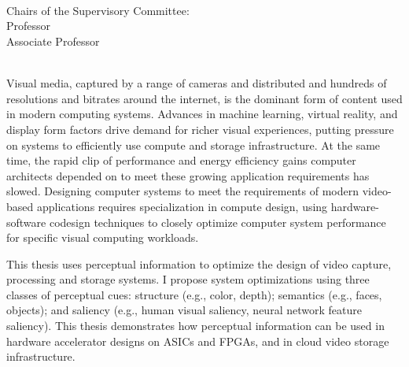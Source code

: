 \begingroup
\let\clearpage\relax
\let\cleardoublepage\relax
\let\cleardoublepage\relax

\thispagestyle{empty}
\begin{center}
     \\
    \bigskip
    {\color{CTtitle}\spacedallcaps{\myTitle} \\ \bigskip
    }
    \bigskip
    \myName \\
    \bigskip
    Chairs of the Supervisory Committee: \\
    Professor \myChair \\
    Associate Professor \myOtherChair \\
    \myDepartment \\
    \bigskip
\end{center}


Visual media, captured by a range of cameras and distributed and hundreds of resolutions and bitrates around the internet, is the dominant form of content used in modern computing systems.
Advances in machine learning, virtual reality, and display form factors drive demand for richer visual experiences, putting pressure on systems to efficiently use compute and storage infrastructure.
At the same time, the rapid clip of performance and energy efficiency gains computer architects depended on to meet these growing application requirements has slowed.
Designing computer systems to meet the requirements of modern video-based applications requires specialization in compute design, using hardware-software codesign techniques to closely optimize computer system performance for specific visual computing workloads.

This thesis uses perceptual information to optimize the design of video capture, processing and storage systems.
I propose system optimizations using three classes of perceptual cues: structure (e.g., color, depth); semantics (e.g., faces, objects); and saliency (e.g., human visual saliency, neural network feature saliency).
This thesis demonstrates how perceptual information can be used in hardware accelerator designs on ASICs and FPGAs, and in cloud video storage infrastructure.

\endgroup

\vfill
